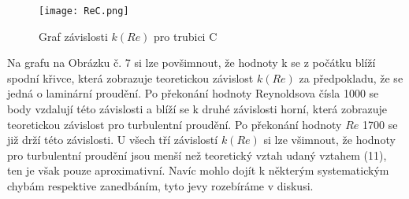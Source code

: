 \documentclass[a4paper]{article}
\begin{document}
\begin{figure}[H]
\centering
\texttt{[image: ReC.png]}
\caption{Graf závislosti $k(Re)$ pro trubici C}
\end{figure}
\par Na grafu na Obrázku č. 7 si lze povšimnout, že hodnoty k se z počátku blíží spodní křivce, která zobrazuje teoretickou závislost $k(Re)$ za předpokladu, že se jedná o laminární proudění. Po překonání hodnoty Reynoldsova čísla 1000 se body vzdalují této závislosti a blíží se k druhé závislosti horní, která zobrazuje teoretickou závislost pro turbulentní proudění. Po překonání hodnoty $Re$ 1700 se již drží této závislosti. U všech tří závislostí $k(Re)$ si lze všimnout, že hodnoty pro turbulentní proudění jsou menší než teoretický vztah udaný vztahem (11), ten je však pouze aproximativní. Navíc mohlo dojít k některým systematickým chybám respektive zanedbáním, tyto jevy rozebíráme v diskusi.
\end{document}
